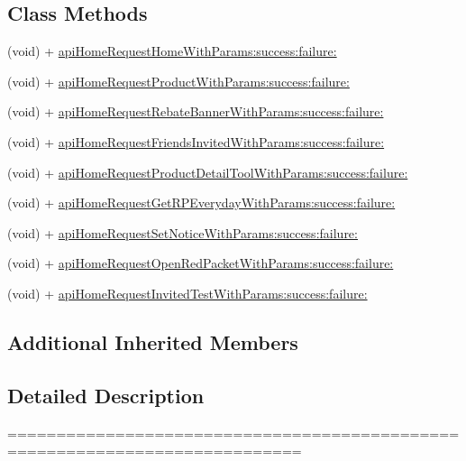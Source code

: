 \subsection*{Class Methods}
\begin{DoxyCompactItemize}
\item 
(void) + \mbox{\hyperlink{interface_j_m_home_a_p_i_tool_aa4578b6bddc62adc508e93686db8c4a0}{api\+Home\+Request\+Home\+With\+Params\+:success\+:failure\+:}}
\item 
(void) + \mbox{\hyperlink{interface_j_m_home_a_p_i_tool_a1f2e5700e33362601f1682d7d31b2a2b}{api\+Home\+Request\+Product\+With\+Params\+:success\+:failure\+:}}
\item 
(void) + \mbox{\hyperlink{interface_j_m_home_a_p_i_tool_a077cf647e4039008d195ff2f836bf0d9}{api\+Home\+Request\+Rebate\+Banner\+With\+Params\+:success\+:failure\+:}}
\item 
(void) + \mbox{\hyperlink{interface_j_m_home_a_p_i_tool_a5fc144f0453f18debc9b3f95d062406f}{api\+Home\+Request\+Friends\+Invited\+With\+Params\+:success\+:failure\+:}}
\item 
(void) + \mbox{\hyperlink{interface_j_m_home_a_p_i_tool_abb5f695c4a44f2f4a7380b42cd38c662}{api\+Home\+Request\+Product\+Detail\+Tool\+With\+Params\+:success\+:failure\+:}}
\item 
(void) + \mbox{\hyperlink{interface_j_m_home_a_p_i_tool_a6d88c878495e9188d16b10d42498f32d}{api\+Home\+Request\+Get\+R\+P\+Everyday\+With\+Params\+:success\+:failure\+:}}
\item 
(void) + \mbox{\hyperlink{interface_j_m_home_a_p_i_tool_a514f122302008e896816757dd10ece18}{api\+Home\+Request\+Set\+Notice\+With\+Params\+:success\+:failure\+:}}
\item 
(void) + \mbox{\hyperlink{interface_j_m_home_a_p_i_tool_a64d270e0c5159fcf2b81514c221e9ca4}{api\+Home\+Request\+Open\+Red\+Packet\+With\+Params\+:success\+:failure\+:}}
\item 
(void) + \mbox{\hyperlink{interface_j_m_home_a_p_i_tool_a10e7a84225e25cce60d34a82c817e6bc}{api\+Home\+Request\+Invited\+Test\+With\+Params\+:success\+:failure\+:}}
\end{DoxyCompactItemize}
\subsection*{Additional Inherited Members}


\subsection{Detailed Description}
============================================================================

